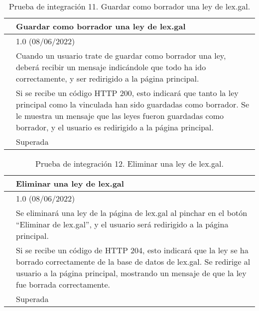 \begin{table}[H]
\begin{center}
\begin{tabular}{|p{3cm}|p{10cm}|} \hline
\centering {\bf PI-11} & Guardar como borrador una ley de lex.gal  \\ \hline\hline
\centering {\bf Versión} & 1.0 (08/06/2022) \\ \hline
\centering {\bf Descripción} & Cuando un usuario trate de guardar como borrador una ley, deberá recibir un mensaje indicándole que todo ha ido correctamente, y ser redirigido a la página principal. \\ \hline
\centering {\bf Criterio de aceptación} & Si se recibe un código HTTP 200, esto indicará que tanto la ley principal como la vinculada han sido guardadas como borrador. Se le muestra un mensaje que las leyes fueron guardadas como borrador, y el usuario es redirigido a la página principal. \\ \hline
\centering {\bf Estado} & Superada \\ \hline
\end{tabular}
\caption{Prueba de integración 11. Guardar como borrador una ley de lex.gal.}
\label{enlacePI11}
\end{center}
\end{table}

\begin{table}[H]
\begin{center}
\begin{tabular}{|p{3cm}|p{10cm}|} \hline
\centering {\bf PI-12} & Eliminar una ley de lex.gal  \\ \hline\hline
\centering {\bf Versión} & 1.0 (08/06/2022) \\ \hline
\centering {\bf Descripción} & Se eliminará una ley de la página de lex.gal al pinchar en el botón ``Eliminar de lex.gal'', y el usuario será redirigido a la página principal. \\ \hline
\centering {\bf Criterio de aceptación} & Si se recibe un código de HTTP 204, esto indicará que la ley se ha borrado correctamente de la base de datos de lex.gal. Se redirige al usuario a la página principal, mostrando un mensaje de que la ley fue borrada correctamente. \\ \hline
\centering {\bf Estado} & Superada \\ \hline
\end{tabular}
\caption{Prueba de integración 12. Eliminar una ley de lex.gal.}
\label{enlacePI12}
\end{center}
\end{table}

